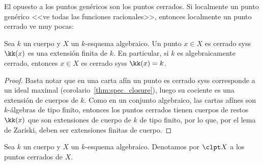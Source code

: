 
El opuesto a los puntos genéricos son los puntos cerrados.
Si localmente un punto genérico <<ve todas las funciones racionales>>, entonces localmente un punto cerrado ve muy pocas:
\begin{prop}
	Sea $k$ un cuerpo y $X$ un $k$-esquema algebraico.
	Un punto $x \in X$ es cerrado syss $\kk(x)$ es una extensión finita de $k$.
	En particular, si $k$ es algebraicamente cerrado, entonces $x \in X$ es cerrado syss $\kk(x) = k$.
\end{prop}
\begin{proof}
	Basta notar que en una carta afín un punto es cerrado syss corresponde a un ideal maximal (corolario~\ref{thm:spec_closure}),
	luego su cociente es una extensión de cuerpos de $k$.
	Como en un conjunto algebraico, las cartas afínes son $k$-álgebras de tipo finito, entonces los puntos cerrados tienen cuerpos de
	restos $\kk(x)$ que son extensiones de cuerpo de $k$ de tipo finito, por lo que, por
	el lema de Zariski, deben ser extensiones finitas de cuerpo.
\end{proof}

\begin{mydef}
	Sea $k$ un cuerpo y $X$ un $k$-esquema algebraico. Denotamos por $\clpt X$ a los puntos cerrados de $X$.
\end{mydef}


